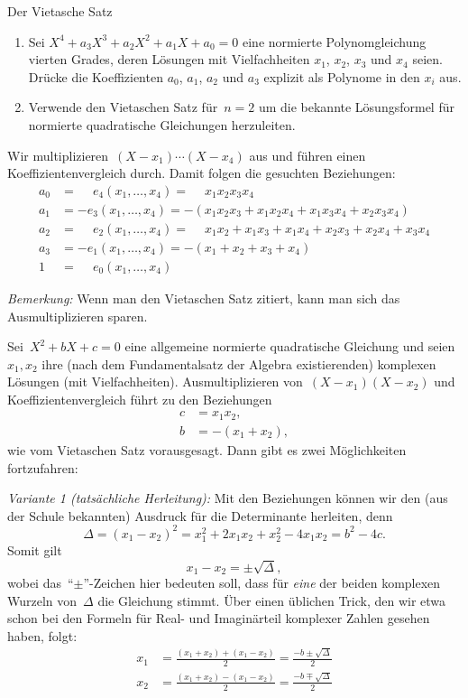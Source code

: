 \documentclass{algblatt}
\begin{document}
\begin{aufgabe}{Der Vietasche Satz}
\begin{enumerate}
\item Sei $X^4 + a_3 X^3 + a_2 X^2 + a_1 X + a_0 = 0$ eine normierte Polynomgleichung
vierten Grades, deren Lösungen mit Vielfachheiten $x_1$, $x_2$, $x_3$
und $x_4$ seien. Drücke die Koeffizienten $a_0$, $a_1$, $a_2$ und
$a_3$ explizit als Polynome in den $x_i$ aus.
\item Verwende den Vietaschen Satz für~$n = 2$ um die bekannte Lösungsformel
für normierte quadratische Gleichungen herzuleiten.
\end{enumerate}
\begin{loesungE}
\item Wir multiplizieren~$(X - x_1) \cdots (X - x_4)$ aus und führen einen
Koeffizientenvergleich durch. Damit folgen die gesuchten Beziehungen:
\begin{align*}
  a_0 &= \phantom{+} e_4(x_1,\ldots,x_4) = \phantom{+} x_1 x_2 x_3 x_4 \\
  a_1 &= - e_3(x_1,\ldots,x_4) = -(x_1 x_2 x_3 + x_1 x_2 x_4 + x_1 x_3 x_4 + x_2 x_3 x_4) \\
  a_2 &= \phantom{+} e_2(x_1,\ldots,x_4) = \phantom{+} x_1 x_2 + x_1 x_3 + x_1 x_4 + x_2 x_3 + x_2 x_4 + x_3 x_4 \\
  a_3 &= -e_1(x_1,\ldots,x_4) = -(x_1 + x_2 + x_3 + x_4) \\
    1 &= \phantom{+} e_0(x_1,\ldots,x_4)
\end{align*}

\emph{Bemerkung:} Wenn man den Vietaschen Satz zitiert, kann man sich das
Ausmultiplizieren sparen.

\item Sei~$X^2 + bX + c = 0$ eine allgemeine normierte quadratische Gleichung
und seien~$x_1, x_2$ ihre (nach dem Fundamentalsatz der Algebra existierenden)
komplexen Lösungen (mit Vielfachheiten).
Ausmultiplizieren von~$(X-x_1) (X-x_2)$ und Koeffizientenvergleich führt zu den
Beziehungen
\begin{align*}
  c &= x_1 x_2, \\
  b &= -(x_1 + x_2),
\end{align*}
wie vom Vietaschen Satz vorausgesagt.
Dann gibt es zwei Möglichkeiten fortzufahren:

\emph{Variante 1 (tatsächliche Herleitung):} Mit den Beziehungen können wir
den (aus der Schule bekannten) Ausdruck für die Determinante herleiten, denn
\[ \Delta = (x_1 - x_2)^2 = x_1^2 + 2x_1x_2 + x_2^2 - 4x_1x_2 = b^2 - 4c. \]
Somit gilt
\[ x_1 - x_2 = \pm\sqrt{\Delta}, \]
wobei das~"`$\pm$"'-Zeichen hier bedeuten soll, dass für \emph{eine} der beiden
komplexen Wurzeln von~$\Delta$ die Gleichung stimmt. Über einen üblichen Trick,
den wir etwa schon bei den Formeln für Real- und Imaginärteil komplexer Zahlen
gesehen haben, folgt:
\begin{align*}
  x_1 &= \frac{(x_1 + x_2) + (x_1 - x_2)}{2} = \frac{-b \pm \sqrt{\Delta}}{2} \\
  x_2 &= \frac{(x_1 + x_2) - (x_1 - x_2)}{2} = \frac{-b \mp \sqrt{\Delta}}{2}
\end{align*}


\end{loesungE}
\end{aufgabe}
\end{document}
